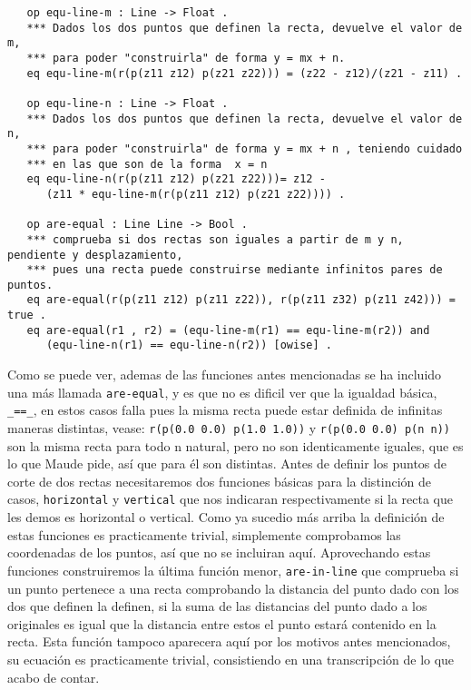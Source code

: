 {\codesize
\begin{verbatim}
   op equ-line-m : Line -> Float .
   *** Dados los dos puntos que definen la recta, devuelve el valor de m, 
   *** para poder "construirla" de forma y = mx + n.
   eq equ-line-m(r(p(z11 z12) p(z21 z22))) = (z22 - z12)/(z21 - z11) .

   op equ-line-n : Line -> Float .
   *** Dados los dos puntos que definen la recta, devuelve el valor de n, 
   *** para poder "construirla" de forma y = mx + n , teniendo cuidado 
   *** en las que son de la forma  x = n
   eq equ-line-n(r(p(z11 z12) p(z21 z22)))= z12 - 
      (z11 * equ-line-m(r(p(z11 z12) p(z21 z22)))) .

   op are-equal : Line Line -> Bool .
   *** comprueba si dos rectas son iguales a partir de m y n, pendiente y desplazamiento, 
   *** pues una recta puede construirse mediante infinitos pares de puntos.
   eq are-equal(r(p(z11 z12) p(z11 z22)), r(p(z11 z32) p(z11 z42))) = true . 
   eq are-equal(r1 , r2) = (equ-line-m(r1) == equ-line-m(r2)) and 
      (equ-line-n(r1) == equ-line-n(r2)) [owise] .
\end{verbatim}
}

Como se puede ver, ademas de las funciones antes mencionadas se ha incluido una más llamada \texttt{are-equal}, y es que no es dificil ver que la igualdad básica, \verb"_==_", en estos casos falla pues la misma recta puede estar definida de infinitas maneras distintas, vease: \texttt{r(p(0.0 0.0) p(1.0 1.0))} y \texttt{r(p(0.0 0.0) p(n n))} son la misma recta para todo n natural, pero no son identicamente iguales, que es lo que Maude pide, así que para él son distintas. Antes de definir los puntos de corte de dos rectas necesitaremos dos funciones básicas para la distinción de casos, \texttt{horizontal} y \texttt{vertical} que nos indicaran respectivamente si la recta que les demos es horizontal o vertical. Como ya sucedio más arriba la definición de estas funciones es practicamente trivial, simplemente comprobamos las coordenadas de los puntos, así que no se incluiran aquí. Aprovechando estas funciones construiremos la última función menor, \texttt{are-in-line} que comprueba si un punto pertenece a una recta comprobando la distancia del punto dado con los dos que definen la definen, si la suma de las distancias del punto dado a los originales es igual que la distancia entre estos el punto estará contenido en la recta. Esta función tampoco aparecera aquí por los motivos antes mencionados, su ecuación es practicamente trivial, consistiendo en una transcripción de lo que acabo de contar.\par

